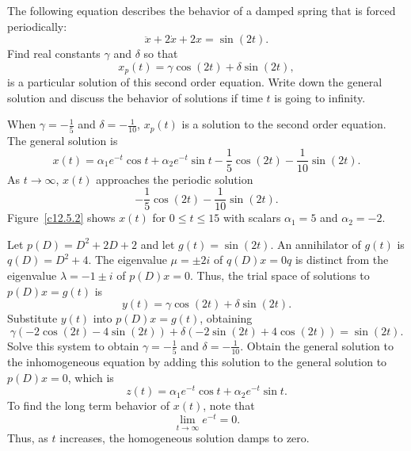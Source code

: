 \documentclass{ximera}
\begin{document}
\begin{exercise} \label{c12.5.2}
The following equation describes the behavior of a damped 
spring that is 
forced periodically:
\[
\ddot x + 2\dot x + 2x = \sin(2t).
\]
Find real constants $\gamma$ and $\delta$ so that
\[
x_p(t) = \gamma \cos(2t)+ \delta \sin(2t),
\]
is a particular solution of this second order equation.  Write down the
general solution and discuss the behavior of solutions if time $t$
is going to infinity.

\begin{solution}
\ans When $\gamma = -\frac{1}{5}$ and $\delta = -\frac{1}{10}$,
$x_p(t)$ is a solution to the second order equation.  The general solution
is
\[
x(t) = \alpha_1e^{-t}\cos t + \alpha_2e^{-t}\sin t
- \frac{1}{5}\cos(2t) - \frac{1}{10}\sin(2t).
\]
As $t \rightarrow \infty$, $x(t)$ approaches the periodic solution
\[
- \frac{1}{5}\cos(2t) - \frac{1}{10}\sin(2t).
\]
Figure~\ref{c12.5.2} shows $x(t)$ for $0 \leq t \leq 15$ with scalars
$\alpha_1 = 5$ and $\alpha_2 = -2$.

\soln Let $p(D) = D^2 + 2D + 2$ and let $g(t) = \sin(2t)$.  An annihilator
of $g(t)$ is $q(D) = D^2 + 4$.  The eigenvalue $\mu = \pm 2i$ of
$q(D)x = 0q$ is distinct from the eigenvalue $\lambda = -1 \pm i$ of
$p(D)x = 0$.  Thus, the trial space of solutions to $p(D)x = g(t)$ is
\[
y(t) = \gamma\cos(2t) + \delta\sin(2t).
\]
Substitute $y(t)$ into $p(D)x = g(t)$, obtaining
\[
\gamma(-2\cos(2t) - 4\sin(2t)) + \delta(-2\sin(2t) + 4\cos(2t)) = \sin(2t).
\]
Solve this system to obtain $\gamma = -\frac{1}{5}$ and
$\delta = -\frac{1}{10}$.  Obtain the general solution to the inhomogeneous
equation by adding this solution to the general solution to $p(D)x = 0$,
which is
\[
z(t) = \alpha_1e^{-t}\cos t + \alpha_2e^{-t}\sin t.
\]
To find the long term behavior of $x(t)$, note that
\[
\lim_{t \rightarrow \infty}e^{-t} = 0.
\]
Thus, as $t$ increases, the homogeneous solution damps to zero. 

\begin{figure}[htb]
                       \centerline{%
                       }
\end{figure}


\end{solution}
\end{exercise}
\end{document}
